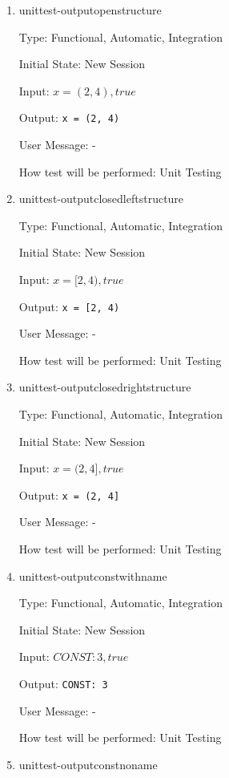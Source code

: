 \documentclass[12pt, titlepage]{article}
\begin{document}
\begin{enumerate}
	
	\item{unittest-outputopenstructure}
	
	Type: Functional, Automatic, Integration
	
	Initial State: New Session
	
	Input: $x = (2,4), true$
	
	Output: \texttt{x = (2, 4)}
	
	User Message: - 
	
	How test will be performed: Unit Testing\\
	
	\item{unittest-outputclosedleftstructure}
	
	Type: Functional, Automatic, Integration
	
	Initial State: New Session
	
	Input: $x = [2,4), true$
	
	Output: \texttt{x = [2, 4)}
	
	User Message: - 
	
	How test will be performed: Unit Testing\\
	
	\item{unittest-outputclosedrightstructure}
	
	Type: Functional, Automatic, Integration
	
	Initial State: New Session
	
	Input: $x = (2,4], true$
	
	Output: \texttt{x = (2, 4]}
	
	User Message: - 
	
	How test will be performed: Unit Testing\\
	
	\item{unittest-outputconstwithname}
	
	Type: Functional, Automatic, Integration
	
	Initial State: New Session
	
	Input: $CONST: 3, true$
	
	Output: \texttt{CONST: 3}
	
	User Message: - 
	
	How test will be performed: Unit Testing\\
	
	\item{unittest-outputconstnoname}
	

\end{enumerate}
\end{document}
